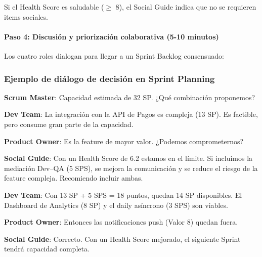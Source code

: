 Si el Health Score es saludable ($\geq$ 8), el Social Guide indica que no se requieren items sociales.

\paragraph{Paso 4: Discusión y priorización colaborativa (5-10 minutos)}

Los cuatro roles dialogan para llegar a un Sprint Backlog consensuado:

\subsubsection*{Ejemplo de diálogo de decisión en Sprint Planning}

\begin{escenario}

    \textbf{Scrum Master}: Capacidad estimada de 32 SP. ¿Qué combinación proponemos?

    \textbf{Dev Team}: La integración con la API de Pagos es compleja (13 SP). Es factible, pero consume gran parte de la capacidad.

    \textbf{Product Owner}: Es la feature de mayor valor. ¿Podemos comprometernos?

    \textbf{Social Guide}: Con un Health Score de 6.2 estamos en el límite. Si incluimos la mediación Dev--QA (5 SPS), se mejora la comunicación y se reduce el riesgo de la feature compleja. Recomiendo incluir ambas.

    \textbf{Dev Team}: Con 13 SP + 5 SPS = 18 puntos, quedan 14 SP disponibles. El Dashboard de Analytics (8 SP) y el daily asíncrono (3 SPS) son viables.

    \textbf{Product Owner}: Entonces las notificaciones push (Valor 8) quedan fuera.

    \textbf{Social Guide}: Correcto. Con un Health Score mejorado, el siguiente Sprint tendrá capacidad completa.

\end{escenario}

